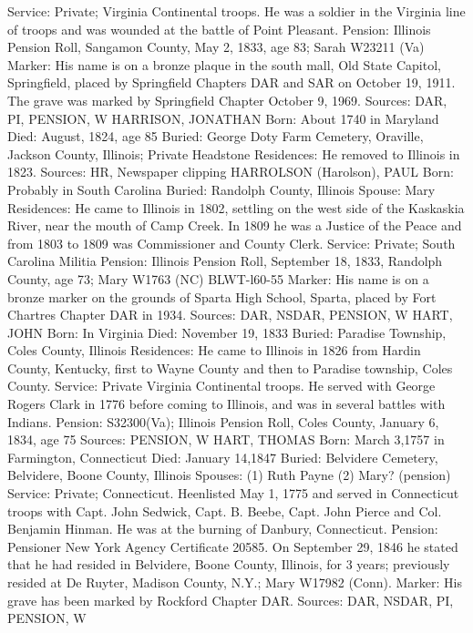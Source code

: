 Service: Private; Virginia Continental troops. He was a soldier in the Virginia line of troops and was wounded at the battle of Point Pleasant. 
Pension: Illinois Pension Roll, Sangamon County, May 2, 1833, age 83; Sarah W23211 (Va) 
Marker: His name is on a bronze plaque in the south mall, Old State Capitol, Springfield, placed by Springfield Chapters DAR and SAR on October 19, 1911. The grave was marked by Springfield Chapter October 9, 1969. 
Sources: DAR, PI, PENSION, W 
HARRISON, JONATHAN 
Born: About 1740 in Maryland 
Died: August, 1824, age 85 
Buried: George Doty Farm Cemetery, Oraville, Jackson County, Illinois; Private Headstone Residences: He removed to Illinois in 1823. Sources: HR, Newspaper clipping HARROLSON (Harolson), PAUL Born: Probably in South Carolina Buried: Randolph County, Illinois 
Spouse: Mary Residences: He came to Illinois in 1802, settling on the west side of the Kaskaskia River, near the mouth of Camp Creek. In 1809 he was a Justice of the Peace and from 1803 to 1809 was Commissioner and County Clerk. 
Service: Private; South Carolina Militia Pension: Illinois Pension Roll, September 18, 1833, Randolph County, age 73; Mary W1763 (NC) BLWT-l60-55 
Marker: His name is on a bronze marker on the grounds of Sparta High School, Sparta, placed by Fort Chartres Chapter DAR in 1934. 
Sources: DAR, NSDAR, PENSION, W 
HART, JOHN 
Born: In Virginia 
Died: November 19, 1833 Buried: Paradise Township, Coles County, Illinois 
Residences: He came to Illinois in 1826 from Hardin County, Kentucky, first to Wayne County and then to Paradise township, Coles County. 
Service: Private Virginia Continental troops. He served with George Rogers Clark in 1776 before coming to Illinois, and was in several battles with Indians. 
Pension: S32300(Va); Illinois Pension Roll, Coles County, January 6, 1834, age 75 
Sources: PENSION, W 
HART, THOMAS 
 Born: March 3,1757 in Farmington, Connecticut Died: January 14,1847 Buried: Belvidere Cemetery, Belvidere, Boone County, Illinois 
Spouses: (1) Ruth Payne 
	 (2) Mary? (pension) 
Service: Private; Connecticut. Heenlisted May 1, 1775 and served in Connecticut troops with Capt. John Sedwick, Capt. B. Beebe, Capt. John Pierce and Col. Benjamin Hinman. He was at the burning of Danbury, Connecticut. Pension: Pensioner New York Agency Certificate 20585. On September 29, 1846 he stated that he had resided in Belvidere, Boone County, Illinois, for 3 years; previously resided at De Ruyter, Madison County, N.Y.; Mary W17982 (Conn). 
Marker: His grave has been marked by Rockford Chapter DAR. 
Sources: DAR, NSDAR, PI, PENSION, W 

